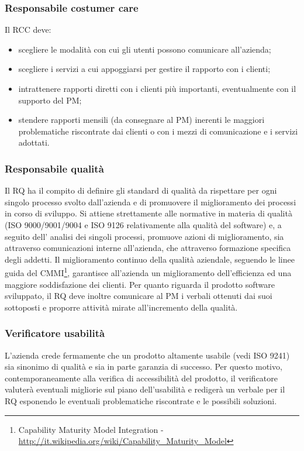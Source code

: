 \subsubsection{Responsabile costumer care}
Il RCC deve:
\begin{itemize}
\item scegliere le modalit\`{a} con cui gli utenti possono comunicare all\textquoteright{}azienda;
\item scegliere i servizi a cui appoggiarsi per gestire il rapporto con i clienti;
\item intrattenere rapporti diretti con i clienti pi\`{u} importanti, eventualmente con il
supporto del PM;
\item stendere rapporti mensili (da consegnare al PM) inerenti le maggiori problematiche
riscontrate dai clienti o con i mezzi di comunicazione e i servizi adottati.
\end{itemize}

\subsubsection{Responsabile qualit\`{a}}
Il RQ ha il compito di definire gli standard di qualit\`{a} da rispettare per ogni singolo processo
svolto dall\textquoteright{}azienda e di promuovere il miglioramento dei processi in corso di sviluppo.
Si attiene strettamente alle normative in materia di qualit\`{a} (ISO 9000/9001/9004
e ISO 9126 relativamente alla qualit\`{a} del software) e, a seguito dell\textquoteright{} analisi dei singoli
processi, promuove azioni di miglioramento, sia attraverso comunicazioni interne all\textquoteright{}azienda,
che attraverso formazione specifica degli addetti. Il miglioramento continuo
della qualit\`{a} aziendale, seguendo le linee guida del CMMI\footnote{Capability Maturity Model Integration - \url{http://it.wikipedia.org/wiki/Capability\_Maturity\_Model}}, garantisce all\textquoteright{}azienda un
miglioramento dell\textquoteright{}efficienza ed una maggiore soddisfazione dei clienti. Per quanto riguarda
il prodotto software sviluppato, il RQ deve inoltre comunicare al PM i verbali
ottenuti dai suoi sottoposti e proporre attivit\`{a} mirate all\textquoteright{}incremento della qualit\`{a}.

\subsubsection{Verificatore usabilit\`{a}}
L\textquoteright{}azienda crede fermamente che un prodotto altamente usabile (vedi ISO 9241) sia
sinonimo di qualit\`{a} e sia in parte garanzia di successo. Per questo motivo, contemporaneamente
alla verifica di accessibilit\`{a} del prodotto, il verificatore valuter\`{a} eventuali
migliorie sul piano dell\textquoteright{}usabilit\`{a} e rediger\`{a} un verbale per il RQ esponendo le eventuali problematiche riscontrate e le possibili soluzioni.

